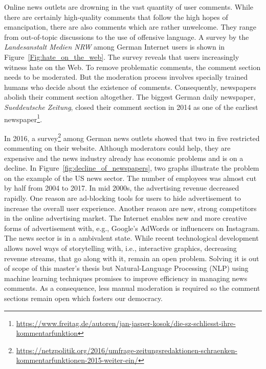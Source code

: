 Online news outlets are drowning in the vast quantity of user comments. While there are certainly high-quality comments that follow the high hopes of emancipation, there are also comments which are rather unwelcome. They range from out-of-topic discussions to the use of offensive language. A survey by the \textit{Landesanstalt Medien NRW} among German Internet users is shown in Figure~\ref{Fig:hate_on_the_web}. The survey reveals that users increasingly witness hate on the Web. To remove problematic comments, the comment section needs to be moderated. But the moderation process involves specially trained humans who decide about the existence of comments. Consequently, newspapers abolish their comment section altogether. The biggest German daily newspaper, \textit{Sueddeutsche Zeitung}, closed their comment section in 2014 as one of the earliest newspaper\footnote{\url{https://www.freitag.de/autoren/jan-jasper-kosok/die-sz-schliesst-ihre-kommentarfunktion}}.

In 2016, a survey\footnote{\url{https://netzpolitik.org/2016/umfrage-zeitungsredaktionen-schraenken-kommentarfunktionen-2015-weiter-ein/}} among German news outlets showed that two in five restricted commenting on their website.
Although moderators could help, they are expensive and the news industry already has economic problems and is on a decline.
In Figure~\ref{fig:decline_of_newspapers}, two graphs illustrate the problem on the example of the US news sector. The number of employees was almost cut by half from 2004 to 2017. In mid 2000s, the advertising revenue decreased rapidly. One reason are ad-blocking tools for users to hide advertisement to increase the overall user experience. Another reason are new, strong competitors in the online advertising market. The Internet enables new and more creative forms of advertisement with, e.g., Google's AdWords or influencers on Instagram.
The news sector is in a ambivalent state.
While recent technological development allows novel ways of storytelling with, i.e., interactive graphics, decreasing revenue streams, that go along with it, remain an open problem.
Solving it is out of scope of this master's thesis but Natural-Language Processing (NLP) using machine learning techniques promises to improve efficiency in managing news comments.
As a consequence, less manual moderation is required so the comment sections remain open which fosters our democracy.

